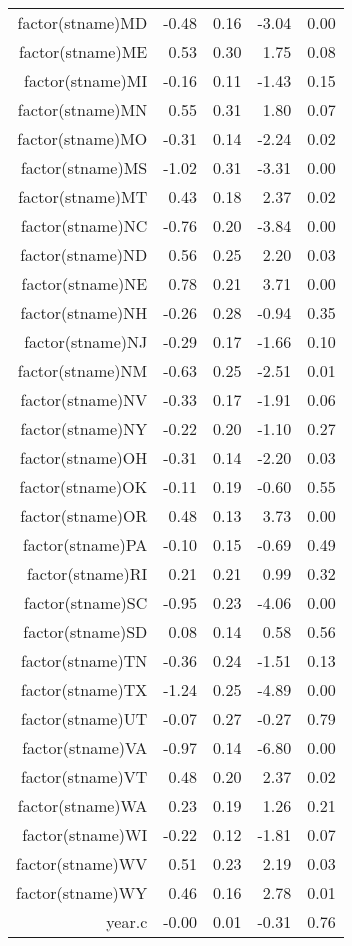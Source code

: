 \begin{table}[ht]
\begin{tabular}{rrrrr}
  factor(stname)MD & -0.48 & 0.16 & -3.04 & 0.00 \\ 
  factor(stname)ME & 0.53 & 0.30 & 1.75 & 0.08 \\ 
  factor(stname)MI & -0.16 & 0.11 & -1.43 & 0.15 \\ 
  factor(stname)MN & 0.55 & 0.31 & 1.80 & 0.07 \\ 
  factor(stname)MO & -0.31 & 0.14 & -2.24 & 0.02 \\ 
  factor(stname)MS & -1.02 & 0.31 & -3.31 & 0.00 \\ 
  factor(stname)MT & 0.43 & 0.18 & 2.37 & 0.02 \\ 
  factor(stname)NC & -0.76 & 0.20 & -3.84 & 0.00 \\ 
  factor(stname)ND & 0.56 & 0.25 & 2.20 & 0.03 \\ 
  factor(stname)NE & 0.78 & 0.21 & 3.71 & 0.00 \\ 
  factor(stname)NH & -0.26 & 0.28 & -0.94 & 0.35 \\ 
  factor(stname)NJ & -0.29 & 0.17 & -1.66 & 0.10 \\ 
  factor(stname)NM & -0.63 & 0.25 & -2.51 & 0.01 \\ 
  factor(stname)NV & -0.33 & 0.17 & -1.91 & 0.06 \\ 
  factor(stname)NY & -0.22 & 0.20 & -1.10 & 0.27 \\ 
  factor(stname)OH & -0.31 & 0.14 & -2.20 & 0.03 \\ 
  factor(stname)OK & -0.11 & 0.19 & -0.60 & 0.55 \\ 
  factor(stname)OR & 0.48 & 0.13 & 3.73 & 0.00 \\ 
  factor(stname)PA & -0.10 & 0.15 & -0.69 & 0.49 \\ 
  factor(stname)RI & 0.21 & 0.21 & 0.99 & 0.32 \\ 
  factor(stname)SC & -0.95 & 0.23 & -4.06 & 0.00 \\ 
  factor(stname)SD & 0.08 & 0.14 & 0.58 & 0.56 \\ 
  factor(stname)TN & -0.36 & 0.24 & -1.51 & 0.13 \\ 
  factor(stname)TX & -1.24 & 0.25 & -4.89 & 0.00 \\ 
  factor(stname)UT & -0.07 & 0.27 & -0.27 & 0.79 \\ 
  factor(stname)VA & -0.97 & 0.14 & -6.80 & 0.00 \\ 
  factor(stname)VT & 0.48 & 0.20 & 2.37 & 0.02 \\ 
  factor(stname)WA & 0.23 & 0.19 & 1.26 & 0.21 \\ 
  factor(stname)WI & -0.22 & 0.12 & -1.81 & 0.07 \\ 
  factor(stname)WV & 0.51 & 0.23 & 2.19 & 0.03 \\ 
  factor(stname)WY & 0.46 & 0.16 & 2.78 & 0.01 \\ 
  year.c & -0.00 & 0.01 & -0.31 & 0.76 \\ 
   \hline
\end{tabular}
\end{table}
